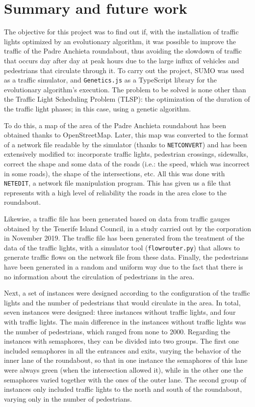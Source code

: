 \chapter{Summary and future work}
\label{cap:conclusions}

The objective for this project was to find out if, with the installation of traffic lights optimized by an evolutionary algorithm, it was possible to improve the traffic of the Padre Anchieta roundabout, thus avoiding the slowdown of traffic that occurs day after day at peak hours due to the large influx of vehicles and pedestrians that circulate through it. To carry out the project, SUMO was used as a traffic simulator, and \texttt{Genetics.js} as a TypeScript library for the evolutionary algorithm's execution. The problem to be solved is none other than the Traffic Light Scheduling Problem (TLSP): the optimization of the duration of the traffic light phases; in this case, using a genetic algorithm.

To do this, a map of the area of the Padre Anchieta roundabout has been obtained thanks to OpenStreetMap. Later, this map was converted to the format of a network file readable by the simulator (thanks to \texttt{NETCONVERT}) and has been extensively modified to: incorporate traffic lights, pedestrian crossings, sidewalks, correct the shape and some data of the roads (i.e.: the speed, which was incorrect in some roads), the shape of the intersections, etc. All this was done with \texttt{NETEDIT}, a network file manipulation program. This has given us a file that represents with a high level of reliability the roads in the area close to the roundabout. 

Likewise, a traffic file has been generated based on data from traffic gauges obtained by the Tenerife Island Council, in a study carried out by the corporation in November 2019. The traffic file has been generated from the treatment of the data of the traffic lights, with a simulator tool (\texttt{flowrouter.py}) that allows to generate traffic flows on the network file from these data. Finally, the pedestrians have been generated in a random and uniform way due to the fact that there is no information about the circulation of pedestrians in the area.

Next, a set of instances were designed according to the configuration of the traffic lights and the number of pedestrians that would circulate in the area. In total, seven instances were designed: three instances without traffic lights, and four with traffic lights. The main difference in the instances without traffic lights was the number of pedestrians, which ranged from none to 2000. Regarding the instances with semaphores, they can be divided into two groups. The first one included semaphores in all the entrances and exits, varying the behavior of the inner lane of the roundabout, so that in one instance the semaphores of this lane were always green (when the intersection allowed it), while in the other one the semaphores varied together with the ones of the outer lane. The second group of instances only included traffic lights to the north and south of the roundabout, varying only in the number of pedestrians.

